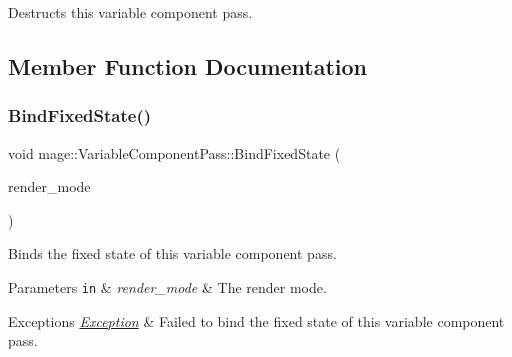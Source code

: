 Destructs this variable component pass. 

\subsection{Member Function Documentation}
\hypertarget{classmage_1_1_variable_component_pass_af020fa18b0df2abe39d953d9e78db37d}{}\label{classmage_1_1_variable_component_pass_af020fa18b0df2abe39d953d9e78db37d} 
\subsubsection{\texorpdfstring{Bind\+Fixed\+State()}{BindFixedState()}}
{\footnotesize\ttfamily void mage\+::\+Variable\+Component\+Pass\+::\+Bind\+Fixed\+State (\begin{DoxyParamCaption}\item[{\hyperlink{namespacemage_a5e7e18b0154373ce8fc942fe3f6b27fd}{Render\+Mode}}]{render\+\_\+mode }\end{DoxyParamCaption})}

Binds the fixed state of this variable component pass.


\begin{DoxyParams}[1]{Parameters}
\mbox{\tt in}  & {\em render\+\_\+mode} & The render mode. \\
\hline
\end{DoxyParams}

\begin{DoxyExceptions}{Exceptions}
{\em \hyperlink{classmage_1_1_exception}{Exception}} & Failed to bind the fixed state of this variable component pass. \\
\hline
\end{DoxyExceptions}
\hypertarget{classmage_1_1_variable_component_pass_abdd0f1d409317c650c7d70fe90ef29b1}{}\label{classmage_1_1_variable_component_pass_abdd0f1d409317c650c7d70fe90ef29b1} 
